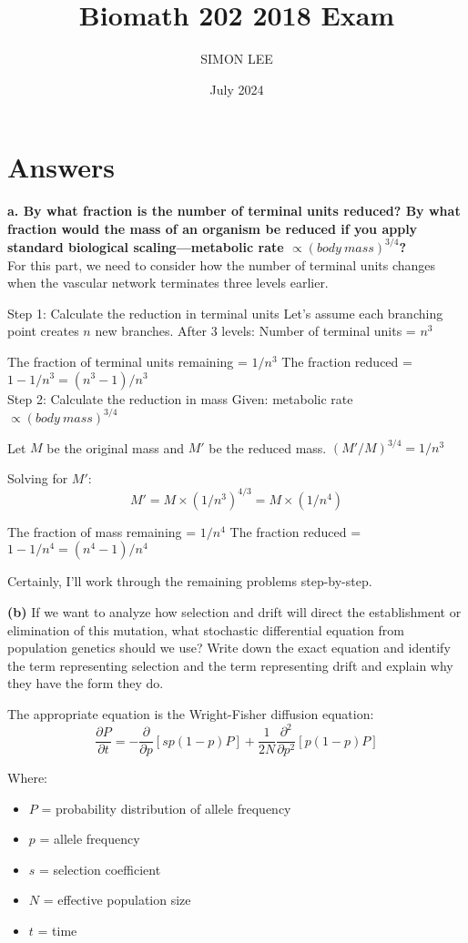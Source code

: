 \documentclass{article}
\title{Biomath 202 2018 Exam}
\author{SIMON LEE}
\date{July 2024}
\begin{document}
\maketitle

\section{Answers}

\textbf{a. By what fraction is the number of terminal units reduced? By what fraction would the mass of an organism be reduced if you apply standard biological scaling—metabolic rate \(\propto (body \ mass)^{3/4}\)?}\\

For this part, we need to consider how the number of terminal units changes when the vascular network terminates three levels earlier.

Step 1: Calculate the reduction in terminal units
Let's assume each branching point creates \(n\) new branches. After 3 levels:
Number of terminal units = \(n^3\)

The fraction of terminal units remaining = \(1/n^3\)
The fraction reduced = \(1 - 1/n^3 = (n^3 - 1)/n^3\)\\

Step 2: Calculate the reduction in mass
Given: metabolic rate \(\propto (body \ mass)^{3/4}\)

Let \(M\) be the original mass and \(M'\) be the reduced mass.
\((M'/M)^{3/4} = 1/n^3\)

Solving for \(M'\):
\[M' = M \times (1/n^3)^{4/3} = M \times (1/n^4)\]

The fraction of mass remaining = \(1/n^4\)
The fraction reduced = \(1 - 1/n^4 = (n^4 - 1)/n^4\)

Certainly, I'll work through the remaining problems step-by-step.

\textbf{(b)} If we want to analyze how selection and drift will direct the establishment or elimination of this mutation, what stochastic differential equation from population genetics should we use? Write down the exact equation and identify the term representing selection and the term representing drift and explain why they have the form they do.

The appropriate equation is the Wright-Fisher diffusion equation:
\[
\frac{\partial P}{\partial t} = -\frac{\partial}{\partial p}[sp(1-p)P] + \frac{1}{2N}\frac{\partial^2}{\partial p^2}[p(1-p)P]
\]

Where:
\begin{itemize}
  \item \( P \) = probability distribution of allele frequency
  \item \( p \) = allele frequency
  \item \( s \) = selection coefficient
  \item \( N \) = effective population size
  \item \( t \) = time
\end{itemize}
\end{document}

